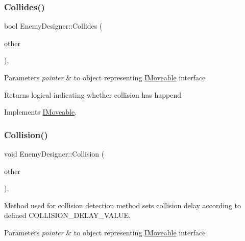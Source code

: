 \subsubsection{\texorpdfstring{Collides()}{Collides()}}
{\footnotesize\ttfamily bool Enemy\+Designer\+::\+Collides (\begin{DoxyParamCaption}\item[{\mbox{\hyperlink{class_i_moveable}{I\+Moveable}} $\ast$}]{other }\end{DoxyParamCaption})\hspace{0.3cm}{\ttfamily [override]}, {\ttfamily [virtual]}}


\begin{DoxyParams}{Parameters}
{\em pointer} & to object representing \mbox{\hyperlink{class_i_moveable}{I\+Moveable}} interface \\
\hline
\end{DoxyParams}
\begin{DoxyReturn}{Returns}
logical indicating whether collision has happend 
\end{DoxyReturn}


Implements \mbox{\hyperlink{class_i_moveable}{I\+Moveable}}.

\mbox{\label{class_enemy_designer_a2d9fb6cc11f8f975b263d6739a1a3ac2}} 
\subsubsection{\texorpdfstring{Collision()}{Collision()}}
{\footnotesize\ttfamily void Enemy\+Designer\+::\+Collision (\begin{DoxyParamCaption}\item[{\mbox{\hyperlink{class_i_moveable}{I\+Moveable}} $\ast$}]{other }\end{DoxyParamCaption})\hspace{0.3cm}{\ttfamily [override]}, {\ttfamily [virtual]}}



Method used for collision detection method sets collision delay according to defined C\+O\+L\+L\+I\+S\+I\+O\+N\+\_\+\+D\+E\+L\+A\+Y\+\_\+\+V\+A\+L\+UE. 


\begin{DoxyParams}{Parameters}
{\em pointer} & to object representing \mbox{\hyperlink{class_i_moveable}{I\+Moveable}} interface \\
\hline
\end{DoxyParams}


